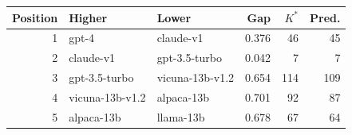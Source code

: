 \begin{tabular}{rllrrr}
\toprule
Position & Higher & Lower & Gap & $K^*$ & Pred. \\
\midrule
1 & gpt-4 & claude-v1 & 0.376 & 46 & 45 \\
2 & claude-v1 & gpt-3.5-turbo & 0.042 & 7 & 7 \\
3 & gpt-3.5-turbo & vicuna-13b-v1.2 & 0.654 & 114 & 109 \\
4 & vicuna-13b-v1.2 & alpaca-13b & 0.701 & 92 & 87 \\
5 & alpaca-13b & llama-13b & 0.678 & 67 & 64 \\
\bottomrule
\end{tabular}
